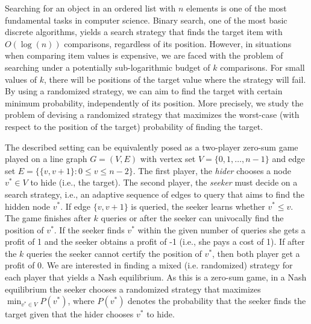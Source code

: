 \documentclass[11pt]{article}
\newcommand\+{\mkern2mu}
\begin{document}
Searching for an object in an ordered list with $n$ elements is one of the most fundamental tasks in computer science. Binary search, one of the most basic discrete algorithms, yields a search strategy that finds the target item with $O(\log(n))$ comparisons, regardless of its position. However, in situations when comparing item values is expensive, we are faced with the problem of searching under a potentially sub-logarithmic  budget of $k$ comparisons. For small values of $k$, there will be positions of the target value where the strategy will fail. By using a randomized strategy, we can aim to find the target with certain minimum probability, independently of its position. More precisely, we study the problem of devising a randomized strategy that maximizes the worst-case (with respect to the position of the target) probability of finding the target.

The described setting can be equivalently posed as a two-player zero-sum game played on a line graph $G=(V,E)$ with vertex set $V=\{0,1,\ldots,n-1\}$ and edge set $E=\{\{v,v+1\}:0\le v\le n-2\}$. The first player, the \emph{hider} chooses a node $v^*\in V$ to hide (i.e., the target). The second player, the \emph{seeker} must decide on a search strategy, i.e., an adaptive sequence of edges to query that aims to find the hidden node $v^*$. If edge $\{v,v+1\}$ is queried, the seeker learns whether $v^*\le v$. The game finishes after $k$ queries or after the seeker can univocally find the position of $v^*$. If the seeker finds $v^*$ within the given number of queries she gets a profit of 1 and the seeker obtains a profit of -1 (i.e., she pays a cost of 1). If after the $k$ queries the seeker cannot certify the position of $v^*$, then both player get a profit of 0. We are interested in finding a mixed (i.e. randomized) strategy for each player that yields a Nash equilibrium. As this is a zero-sum game, in a Nash equilibrium the seeker chooses a randomized strategy that maximizes $\min_{v^*\in V} P(v^*)$, where $P(v^*)$ denotes the probability that the seeker finds the target given that the hider chooses $v^*$ to hide.
\end{document}
